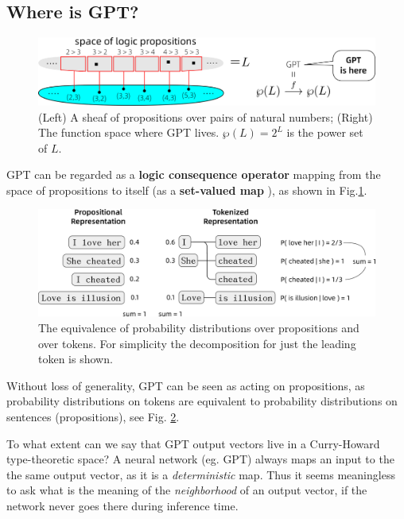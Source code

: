 \documentclass[runningheads]{llncs}
\begin{document}
\subsection{Where is GPT?}

\begin{figure}
	\includegraphics[scale=.5]{GPT-is-here.png}
	\caption{(Left) A sheaf of propositions over pairs of natural numbers; (Right) The function space where GPT lives. $\wp(L) = 2^L$ is the power set of $L$.}
	\label{fig:GPT-is-here}
\end{figure}

GPT \cite{chatGPT2020} can be regarded as a \textbf{logic consequence operator} mapping from the space of propositions to itself (as a \textbf{set-valued map} \cite{Aubin1990}), as shown in Fig.\ref{fig:GPT-is-here}.

\begin{figure}
	\includegraphics[scale=.4]{I-love-her-she-cheats.png}	%
	\caption{The equivalence of probability distributions over propositions and over tokens. For simplicity the decomposition for just the leading token is shown.} \label{fig:she-is-bitch}
\end{figure}

Without loss of generality, GPT can be seen as acting on propositions, as probability distributions on tokens are equivalent to probability distributions on sentences (propositions), see Fig. \ref{fig:she-is-bitch}.

To what extent can we say that GPT output vectors live in a Curry-Howard type-theoretic space?  A neural network (eg. GPT) always maps an input to the the same output vector, as it is a \textit{deterministic} map. Thus it seems meaningless to ask what is the meaning of the \textit{neighborhood} of an output vector, if the network never goes there during inference time.
\end{document}

